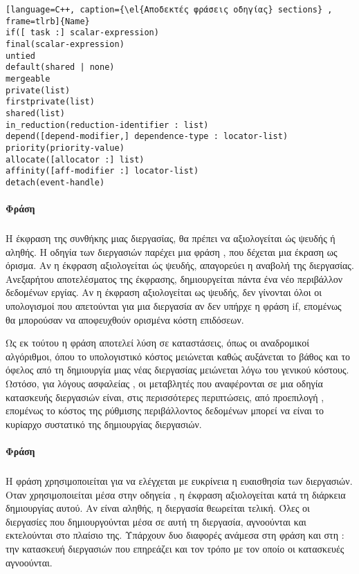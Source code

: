 \begin{lstlisting}[language=C++, caption={\el{Αποδεκτές φράσεις οδηγίας} sections} , frame=tlrb]{Name}
if([ task :] scalar-expression) 
final(scalar-expression) 
untied 
default(shared | none) 
mergeable 
private(list) 
firstprivate(list) 
shared(list) 
in_reduction(reduction-identifier : list) 
depend([depend-modifier,] dependence-type : locator-list) 
priority(priority-value) 
allocate([allocator :] list) 
affinity([aff-modifier :] locator-list) 
detach(event-handle)
\end{lstlisting}

\paragraph{Φράση }
\subparagraph{}
Η έκφραση της συνθήκης \emph{} μιας διεργασίας, θα πρέπει να αξιολογείται ώς ψευδής ή αληθής. 
Η οδηγία των διεργασιών παρέχει μια φράση \emph{}, που δέχεται μια έκραση ως όρισμα. Αν η έκφραση αξιολογείται ώς ψευδής, απαγορεύει η αναβολή της διεργασίας.
Ανεξαρήτου αποτελέσματος της έκφρασης, δημιουργείται πάντα ένα νέο περιβάλλον δεδομένων εργίας. Αν η έκφραση αξιολογείται ως ψευδής, δεν γίνονται όλοι οι υπολογισμοί που απετούνται για μια διεργασία αν δεν υπήρχε η φράση if, επομένως θα μπορούσαν να αποφευχθούν ορισμένα κόστη επιδόσεων.

Ως εκ τούτου η φράση \emph{} αποτελεί λύση σε καταστάσεις, όπως οι αναδρομικοί αλγόριθμοι, όπου
το υπολογιστικό κόστος μειώνεται καθώς αυξάνεται το βάθος και το όφελος από τη δημιουργία μιας νέας διεργασίας
μειώνεται λόγω του γενικού κόστους.
Ωστόσο, για λόγους ασφαλείας \cite{parallel_dist}, οι μεταβλητές που αναφέρονται σε μια οδηγία κατασκευής διεργασιών είναι, στις περισσότερες περιπτώσεις, από προεπιλογή \emph{}, επομένως το κόστος
της ρύθμισης περιβάλλοντος δεδομένων μπορεί να είναι το κυρίαρχο συστατικό της δημιουργίας διεργασιών.

\paragraph{Φράση }
\subparagraph{}
Η φράση χρησιμοποιείται για να ελέγχεται με ευκρίνεια η ευαισθησία των διεργασιών. Οταν χρησιμοποιείται μέσα στην οδηγεία \emph{}, η έκφραση αξιολογείται κατά τη διάρκεια δημιουργίας αυτού.  Αν είναι αληθής, η διεργασία θεωρείται τελική. Όλες οι διεργασίες που δημιουργούνται μέσα σε αυτή τη διεργασία, αγνοούνται και εκτελούνται στο πλαίσιο της.
\clearpage
Υπάρχουν δυο διαφορές ανάμεσα στη φράση \emph{} και στη \emph{}: την κατασκευή διεργασιών που επηρεάζει και τον τρόπο με τον οποίο οι κατασκευές αγνοούνται\cite{tasking1}.

